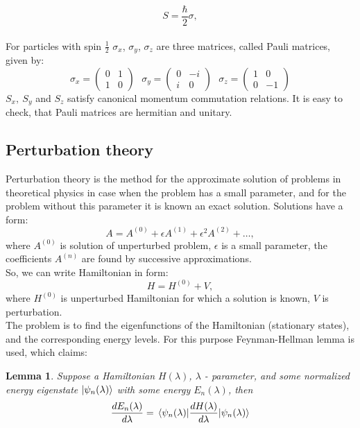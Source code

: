 \documentclass[a4paper, 12pt]{article}
\newtheorem{lemma}{Lemma}
\begin{document}
$$S = \frac{\hbar}{2}\sigma,$$\\
For  particles with spin $\frac{1}{2}$  $\sigma_x$, $\sigma_y$, $\sigma_z$ are three matrices, called  Pauli matrices, given by:
$$\sigma_x = 
\begin{pmatrix}
0 & 1 \\
1 & 0
\end{pmatrix} ~~~
\sigma_y = 
\begin{pmatrix}
0 & -i \\
i & 0
\end{pmatrix} ~~~
\sigma_z = 
\begin{pmatrix}
1 & 0\\
0 & -1
\end{pmatrix}$$
$S_x, ~S_y$ and $S_z$ satisfy  canonical momentum commutation relations. It is easy to check, that Pauli matrices are hermitian and unitary.



\subsection{Perturbation theory}
Perturbation theory is the method for the approximate solution of problems in theoretical physics in case when the problem has a small parameter, and for the problem without this parameter it is known an exact solution. Solutions have a form:
$$A = A^{(0)}+\epsilon A^{(1)}+ \epsilon^2 A^{(2)}+\hdots,$$
where $A^{(0)}$ is solution of unperturbed problem, $\epsilon$ is a small parameter, the coefficients $A^{(n)}$ are found by successive approximations.\\
So, we can write Hamiltonian in form:
$$H = H^{(0)} +V,$$
where $H^{(0)}$ is unperturbed Hamiltonian for which a solution is known, $V$ is perturbation.\\
The problem is to find the eigenfunctions of the Hamiltonian (stationary states), and the corresponding energy levels. For this purpose Feynman-Hellman lemma is used, which claims:

\begin{lemma}
Suppose a Hamiltonian $H(\lambda)$, $\lambda$ - parameter, and some normalized energy eigenstate $\ket{\psi_n(\lambda)}$ with some energy $E_n(\lambda)$, then
$$\frac{dE_n(\lambda)}{d \lambda}=\mel{\psi_n(\lambda)}{\frac{dH(\lambda)}{d \lambda}}{\psi_n(\lambda)}$$
\end{lemma}
\end{document}
